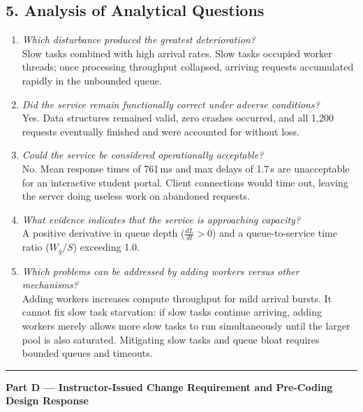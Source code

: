 \documentclass[11pt]{article}
\begin{document}
\subsection*{5. Analysis of Analytical Questions}
\begin{enumerate}[label=\textbf{Q\arabic*:}, leftmargin=1.6em, itemsep=0.3em]
    \item \textit{Which disturbance produced the greatest deterioration?}\\
    Slow tasks combined with high arrival rates. Slow tasks occupied worker threads; once processing throughput collapsed, arriving requests accumulated rapidly in the unbounded queue.
    \item \textit{Did the service remain functionally correct under adverse conditions?}\\
    Yes. Data structures remained valid, zero crashes occurred, and all 1,200 requests eventually finished and were accounted for without loss.
    \item \textit{Could the service be considered operationally acceptable?}\\
    No. Mean response times of 761\,ms and max delays of 1.7\,s are unacceptable for an interactive student portal. Client connections would time out, leaving the server doing useless work on abandoned requests.
    \item \textit{What evidence indicates that the service is approaching capacity?}\\
    A positive derivative in queue depth ($\frac{dL}{dt} > 0$) and a queue-to-service time ratio ($W_q / S$) exceeding 1.0.
    \item \textit{Which problems can be addressed by adding workers versus other mechanisms?}\\
    Adding workers increases compute throughput for mild arrival bursts. It cannot fix slow task starvation: if slow tasks continue arriving, adding workers merely allows more slow tasks to run simultaneously until the larger pool is also saturated. Mitigating slow tasks and queue bloat requires bounded queues and timeouts.
\end{enumerate}

\vspace{1.5em}\hrule\vspace{1.2em}

\newpage
{\centering\fontsize{14}{17}\selectfont\textbf{Part D --- Instructor-Issued Change Requirement and Pre-Coding Design Response}\par}
\vspace{0.6em}
\end{document}
